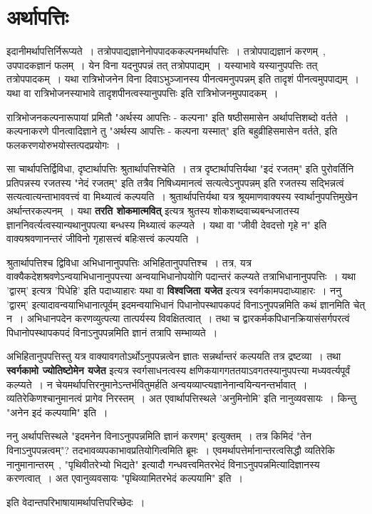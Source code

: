 \section{अर्थापत्तिः}
	इदानीमर्थापत्तिर्निरूप्यते~। तत्रोपपाद्यज्ञानेनोपपादककल्पनमर्थापत्तिः~। तत्रोपपाद्यज्ञानं करणम्~, उपपादकज्ञानं फलम्~। येन विना यदनुपपन्नं तत् तत्रोपपाद्यम्~। यस्याभावे यस्यानुपपत्तिः तत् तत्रोपपादकम्~। यथा रात्रिभोजनेन विना दिवाऽभुञ्जानस्य पीनत्वमनुपपन्नम् इति तादृशं पीनत्वमुपपाद्यम्~। यथा वा रात्रिभोजनस्याभावे तादृशपीनत्वस्यानुपपत्तिः इति रात्रिभोजनमुपपादकम्~।\par
	रात्रिभोजनकल्पनारूपायां प्रमितौ "अर्थस्य आपत्तिः - कल्पना" इति षष्ठीसमासेन अर्थापत्तिशब्दो वर्तते~। कल्पनाकरणे पीनत्वादिज्ञाने तु "अर्थस्य आपत्तिः - कल्पना यस्मात्" इति बहुव्रीहिसमासेन वर्तते, इति फलकरणयोरुभयोस्तत्पदप्रयोगः~।\par
	सा चार्थापत्तिर्द्विविधा, दृष्टार्थापत्तिः श्रुतार्थापत्तिश्चेति~। तत्र दृष्टार्थापत्तिर्यथा "इदं रजतम्" इति पुरोवर्तिनि प्रतिपन्नस्य रजतस्य "नेदं रजतम्" इति तत्रैव निषिध्यमानत्वं सत्यत्वेऽनुपपन्नम् इति रजतस्य सद्भिन्नत्वं सत्यत्वात्यन्ताभाववत्त्वं वा मिथ्यात्वं कल्पयति~। श्रुतार्थापत्तिर्यथा यत्र श्रूयमाणवाक्यस्य स्वार्थानुपपत्तिमुखेन अर्थान्तरकल्पनम्~। यथा {\bfseries तरति शोकमात्मवित्} इत्यत्र श्रुतस्य शोकशब्दवाच्यबन्धजातस्य ज्ञाननिवर्त्यत्वस्यान्यथानुपपत्या बन्धस्य मिथ्यात्वं कल्प्यते~। यथा वा "जीवी देवदत्तो गृहे न" इति वाक्यश्रवणानन्तरं जीविनो गृहासत्त्वं बहिःसत्त्वं कल्पयति~।\par
	श्रुतार्थापत्तिश्च द्विविधा अभिधानानुपपत्तिः अभिहितानुपपत्तिश्च~। तत्र, यत्र वाक्यैकदेशश्रवणेऽन्वयाभिधानानुपपत्त्या अन्वयाभिधानोपयोगि पदान्तरं कल्प्यते तत्राभिधानानुपपत्तिः~। यथा 'द्वारम्' इत्यत्र 'पिधेहि' इति पदाध्याहारः यथा वा {\bfseries विश्वजिता यजेत} इत्यत्र स्वर्गकामपदाध्याहारः~।
	ननु 'द्वारम्' इत्यादावन्वयाभिधानात्पूर्वम् इदमन्वयाभिधानं पिधानोपस्थापकपदं विनाऽनुपपन्नमिति कथं ज्ञानमिति चेत् न~। अभिधानपदेन करणव्युत्पत्या तात्पर्यस्य विवक्षितत्वात्~। तथा च द्वारकर्मकपिधानक्रियासंसर्गपरत्वं पिधानोपस्थापकपदं विनाऽनुपपन्नमिति ज्ञानं तत्रापि सम्भाव्यते~।\par
	अभिहितानुपपत्तिस्तु यत्र वाक्यावगतोऽर्थोऽनुपपन्नत्वेन ज्ञातः सन्नर्थान्तरं कल्पयति तत्र द्रष्टव्या~। तथा {\bfseries स्वर्गकामो ज्योतिष्टोमेन यजेत} इत्यत्र स्वर्गसाधनत्वस्य क्षणिकयागगततयाऽवगतस्यानुपपत्त्या मध्यवर्त्यपूर्वं कल्प्यते~।
	न चेयमर्थापत्तिरनुमानेऽन्तर्भवितुमर्हति अन्वयव्याप्त्यज्ञानेनान्वयिन्यनन्तर्भावात्~। व्यतिरेकिणश्चानुमानत्वं प्रागेव निरस्तम्~। अत एवार्थापत्तिस्थले 'अनुमिनोमि' इति नानुव्यवसायः~। किन्तु "अनेन इदं कल्पयामि" इति~।\par
	ननु अर्थापत्तिस्थले "इदमनेन विनाऽनुपपन्नमिति ज्ञानं करणम्" इत्युक्तम्~। तत्र किमिदं "तेन विनाऽनुपपन्नत्वम्"? तदभावव्यपकाभावप्रतियोगित्वमिति ब्रूमः~। एवमर्थापत्तेर्मानान्तरत्वसिद्धौ व्यतिरेकि नानुमानान्तरम्~, "पृथिवीतरेभ्यो भिद्यते" इत्यादौ गन्धवत्त्वमितरभेदं विनाऽनुपपन्नमित्यादिज्ञानस्य करणत्वात्~। अत एवानुव्यवसायः "पृथिव्यामितरभेदं कल्पयामि" इति~।\\
	\begin{center} इति वेदान्तपरिभाषायामर्थापत्तिपरिच्छेदः~।\end{center}
